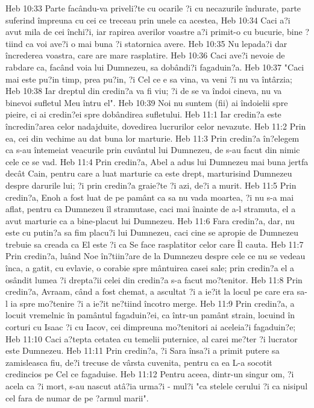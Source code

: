 Heb 10:33  Parte facându-va priveli?te cu ocarile ?i cu necazurile îndurate, parte suferind împreuna cu cei ce treceau prin unele ca acestea,
Heb 10:34  Caci a?i avut mila de cei închi?i, iar rapirea averilor voastre a?i primit-o cu bucurie, bine ?tiind ca voi ave?i o mai buna ?i statornica avere.
Heb 10:35  Nu lepada?i dar încrederea voastra, care are mare rasplatire.
Heb 10:36  Caci ave?i nevoie de rabdare ca, facând voia lui Dumnezeu, sa dobândi?i fagaduin?a.
Heb 10:37  "Caci mai este pu?in timp, prea pu?in, ?i Cel ce e sa vina, va veni ?i nu va întârzia;
Heb 10:38  Iar dreptul din credin?a va fi viu; ?i de se va îndoi cineva, nu va binevoi sufletul Meu întru el".
Heb 10:39  Noi nu suntem (fii) ai îndoielii spre pieire, ci ai credin?ei spre dobândirea sufletului.
Heb 11:1  Iar credin?a este încredin?area celor nadajduite, dovedirea lucrurilor celor nevazute.
Heb 11:2  Prin ea, cei din vechime au dat buna lor marturie.
Heb 11:3  Prin credin?a în?elegem ca s-au întemeiat veacurile prin cuvântul lui Dumnezeu, de s-au facut din nimic cele ce se vad.
Heb 11:4  Prin credin?a, Abel a adus lui Dumnezeu mai buna jertfa decât Cain, pentru care a luat marturie ca este drept, marturisind Dumnezeu despre darurile lui; ?i prin credin?a graie?te ?i azi, de?i a murit.
Heb 11:5  Prin credin?a, Enoh a fost luat de pe pamânt ca sa nu vada moartea, ?i nu s-a mai aflat, pentru ca Dumnezeu îl stramutase, caci mai înainte de a-l stramuta, el a avut marturie ca a bine-placut lui Dumnezeu.
Heb 11:6  Fara credin?a, dar, nu este cu putin?a sa fim placu?i lui Dumnezeu, caci cine se apropie de Dumnezeu trebuie sa creada ca El este ?i ca Se face rasplatitor celor care Îl cauta.
Heb 11:7  Prin credin?a, luând Noe în?tiin?are de la Dumnezeu despre cele ce nu se vedeau înca, a gatit, cu evlavie, o corabie spre mântuirea casei sale; prin credin?a el a osândit lumea ?i drepta?ii celei din credin?a s-a facut mo?tenitor.
Heb 11:8  Prin credin?a, Avraam, când a fost chemat, a ascultat ?i a ie?it la locul pe care era sa-l ia spre mo?tenire ?i a ie?it ne?tiind încotro merge.
Heb 11:9  Prin credin?a, a locuit vremelnic în pamântul fagaduin?ei, ca într-un pamânt strain, locuind în corturi cu Isaac ?i cu Iacov, cei dimpreuna mo?tenitori ai aceleia?i fagaduin?e;
Heb 11:10  Caci a?tepta cetatea cu temelii puternice, al carei me?ter ?i lucrator este Dumnezeu.
Heb 11:11  Prin credin?a, ?i Sara însa?i a primit putere sa zamisleasca fiu, de?i trecuse de vârsta cuvenita, pentru ca ea L-a socotit credincios pe Cel ce fagaduise.
Heb 11:12  Pentru aceea, dintr-un singur om, ?i acela ca ?i mort, s-au nascut atâ?ia urma?i - mul?i "ca stelele cerului ?i ca nisipul cel fara de numar de pe ?armul marii".

